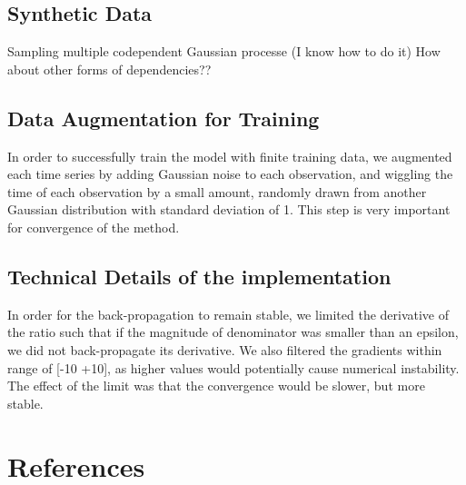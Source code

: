 \documentclass{article} %
\begin{document}
\subsection{Synthetic Data}
Sampling multiple codependent Gaussian processe (I know how to do it)
How about other forms of dependencies??

\subsection{Data Augmentation for Training}
In order to successfully train the model with finite training data, we augmented each time series by adding Gaussian noise to each observation, and wiggling the time of each observation by a small amount, randomly drawn from another Gaussian distribution with standard deviation of 1. This step is very important for convergence of the method. 

\subsection{Technical Details of the implementation}
In order for the back-propagation to remain stable, we limited the derivative of the ratio such that if the magnitude of denominator was smaller than an epsilon, we did not back-propagate its derivative. We also filtered the gradients within range of [-10 +10], as higher values would potentially cause numerical instability. The effect of the limit was that the convergence would be slower, but more stable.




\section{References}
\end{document}
